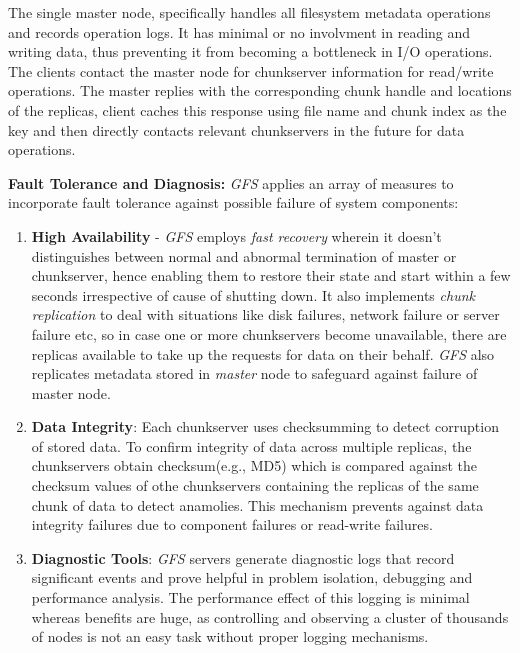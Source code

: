 \documentclass[12pt, a4paper]{article}
\begin{document}
The single master node, specifically handles all filesystem metadata operations and records operation logs. It has minimal or no involvment in reading and writing data, thus preventing it from becoming a bottleneck in I/O operations. The clients contact the master node for chunkserver information for read/write operations. The master replies with the corresponding chunk handle and locations of the replicas, client caches this response using file name and chunk index as the key and then directly contacts relevant chunkservers in the future for data operations.\par

\textbf{Fault Tolerance and Diagnosis:} \textit{GFS}\cite{Ghemawat:2003:GFS:945445.945450} applies an array of measures to incorporate fault tolerance against possible failure of system components:

\begin{enumerate}
        \item \textbf{High Availability} - \textit{GFS}\cite{Ghemawat:2003:GFS:945445.945450} employs \textit{fast recovery} wherein it doesn't distinguishes between normal and abnormal termination of master or chunkserver, hence enabling them to restore their state and start within a few seconds irrespective of cause of shutting down. It also implements \textit{chunk replication} to deal with situations like disk failures, network failure or server failure etc, so in case one or more chunkservers become unavailable, there are replicas available to take up the requests for data on their behalf. \textit{GFS}\cite{Ghemawat:2003:GFS:945445.945450} also replicates metadata stored in \textit{master} node to safeguard against failure of master node.

        \item \textbf{Data Integrity}: Each chunkserver uses checksumming to detect corruption of stored data. To confirm integrity of data across multiple replicas, the chunkservers obtain checksum(e.g., MD5) which is compared against the checksum values of othe chunkservers containing the replicas of the same chunk of data to detect anamolies. This mechanism prevents against data integrity failures due to component failures or read-write failures.

        \item \textbf{Diagnostic Tools}: \textit{GFS}\cite{Ghemawat:2003:GFS:945445.945450} servers generate diagnostic logs that record significant events and prove helpful in problem isolation, debugging and performance analysis. The performance effect of this logging is minimal whereas benefits are huge, as controlling and observing a cluster of thousands of nodes is not an easy task without proper logging mechanisms.
\end{enumerate}

 

\end{document}
